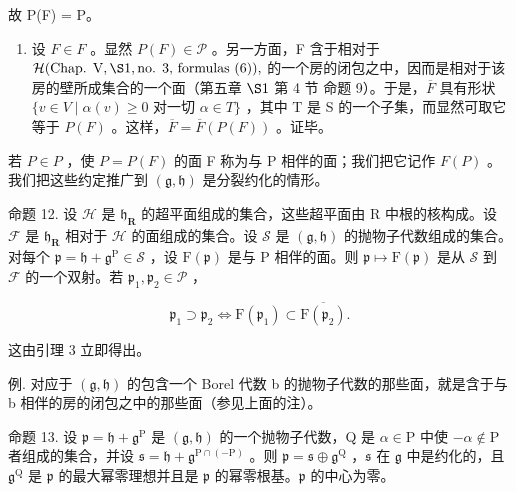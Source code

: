 故 P(F) = P。

\begin{enumerate}
\def\labelenumi{\alph{enumi})}
\setcounter{enumi}{1}
\tightlist
\item
  设 \(F \in F\) 。显然 \(P(F) \in \mathcal{P}\) 。另一方面，F 含于相对于 \(\mathcal{H}(\text{Chap. V}, \S1, \text{no. 3, formulas (6)}),\) 的一个房的闭包之中，因而是相对于该房的壁所成集合的一个面（第五章 \(\S1\) 第 4 节 命题 9）。于是，\(\overline{F}\) 具有形状 \(\{v \in V \mid \alpha(v) \geq 0 \text{ 对一切 } \alpha \in T\}\) ，其中 T 是 S 的一个子集，而显然可取它等于 \(P(F)\) 。这样，\(\overline{F} = \overline{F}(P(F))\) 。证毕。
\end{enumerate}

若 \(P \in P\) ，使 \(P = P(F)\) 的面 F 称为与 P 相伴的面；我们把它记作 \(F(P)\) 。我们把这些约定推广到 \((\mathfrak{g}, \mathfrak{h})\) 是分裂约化的情形。

命题 12. 设 \(\mathcal{H}\) 是 \(\mathfrak{h}_{\mathbf{R}}\) 的超平面组成的集合，这些超平面由 R 中根的核构成。设 \(\mathcal{F}\) 是 \(\mathfrak{h}_{\mathbf{R}}\) 相对于 \(\mathcal{H}\) 的面组成的集合。设 \(\mathcal{S}\) 是 \((\mathfrak{g},\mathfrak{h})\) 的抛物子代数组成的集合。对每个 \(\mathfrak{p} = \mathfrak{h} + \mathfrak{g}^{\mathrm{P}}\in \mathcal{S}\) ，设 \(\mathrm{F}(\mathfrak{p})\) 是与 P 相伴的面。则 \(\mathfrak{p}\mapsto \mathrm{F}(\mathfrak{p})\) 是从 \(\mathcal{S}\) 到 \(\mathcal{F}\) 的一个双射。若 \(\mathfrak{p}_1,\mathfrak{p}_2\in \mathcal{P}\) ，

\[
\mathfrak {p} _ {1} \supset \mathfrak {p} _ {2} \Longleftrightarrow \mathrm{F} (\mathfrak {p} _ {1}) \subset \overline {{\mathrm{F} (\mathfrak {p} _ {2})}}.
\]

这由引理 3 立即得出。

例. 对应于 \((\mathfrak{g}, \mathfrak{h})\) 的包含一个 Borel 代数 b 的抛物子代数的那些面，就是含于与 b 相伴的房的闭包之中的那些面（参见上面的注）。

命题 13. 设 \(\mathfrak{p} = \mathfrak{h} + \mathfrak{g}^{\mathrm{P}}\) 是 \((\mathfrak{g},\mathfrak{h})\) 的一个抛物子代数，Q 是 \(\alpha \in \mathrm{P}\) 中使 \(-\alpha \notin \mathrm{P}\) 者组成的集合，并设 \(\mathfrak{s} = \mathfrak{h} + \mathfrak{g}^{\mathrm{P}\cap (-\mathrm{P})}\) 。则 \(\mathfrak{p} = \mathfrak{s} \oplus \mathfrak{g}^{\mathrm{Q}}\) ，\(\mathfrak{s}\) 在 \(\mathfrak{g}\) 中是约化的，且 \(\mathfrak{g}^{\mathrm{Q}}\) 是 \(\mathfrak{p}\) 的最大幂零理想并且是 \(\mathfrak{p}\) 的幂零根基。\(\mathfrak{p}\) 的中心为零。


